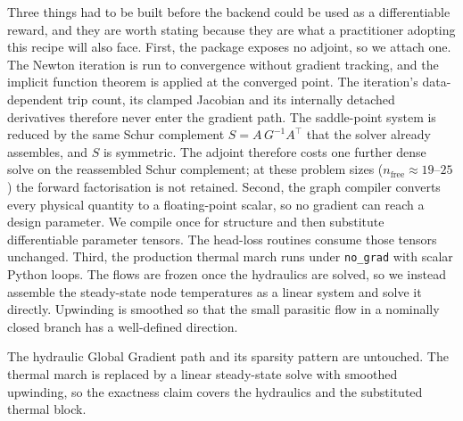 \documentclass[journal]{IEEEtran}
\begin{document}
Three things had to be built before the backend could be used as a differentiable
reward, and they are worth stating because they are what a practitioner adopting this
recipe will also face.  First, the package exposes no adjoint, so we attach one.  The Newton iteration is
run to convergence without gradient tracking, and the implicit function theorem is
applied at the converged point.  The iteration's data-dependent trip count, its
clamped Jacobian and its internally detached derivatives therefore never enter the
gradient path.  The saddle-point system is
reduced by the same Schur complement $S=A\,G^{-1}A^{\!\top}$ that the solver already
assembles, and $S$ is symmetric.  The adjoint therefore costs one further dense
solve on the reassembled Schur complement; at these problem sizes
($n_{\mathrm{free}}\approx19$--$25$) the forward factorisation is not retained.  Second, the graph compiler converts every physical quantity to a floating-point
scalar, so no gradient can reach a design parameter.  We compile once for structure
and then substitute differentiable parameter tensors.  The head-loss routines
consume those tensors unchanged.  Third, the production thermal march runs under \texttt{no\_grad} with scalar Python
loops.  The flows are frozen once the hydraulics are solved, so we instead assemble
the steady-state node temperatures as a linear system and solve it directly.
Upwinding is smoothed so that the small parasitic flow in a nominally closed branch
has a well-defined direction.

The hydraulic Global Gradient path and its sparsity pattern are untouched.  The
thermal march is replaced by a linear steady-state solve with smoothed upwinding,
so the exactness claim covers the hydraulics and the substituted thermal block.
\end{document}
